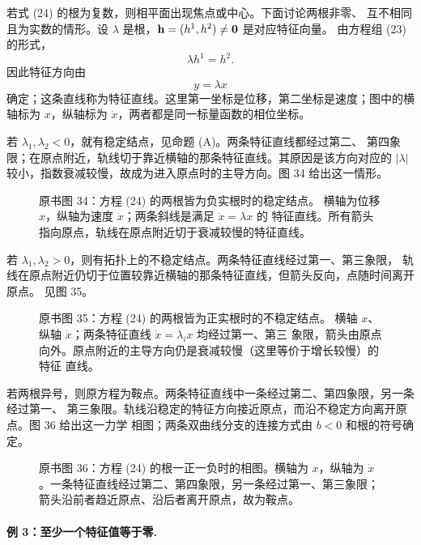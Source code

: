 若式 (24) 的根为复数，则相平面出现焦点或中心。下面讨论两根非零、
互不相同且为实数的情形。设 \(\lambda\) 是根，\(\vect{h}=(h^1,h^2)\neq\vect{0}\) 是对应特征向量。
由方程组 (23) 的形式，
\[
 \lambda h^1=h^2.
\]
因此特征方向由
\begin{equation}
 y=\lambda x
 \tag{25}
\end{equation}
确定；这条直线称为特征直线。这里第一坐标是位移，第二坐标是速度；图中的横轴标为
\(x\)，纵轴标为 \(\dot x\)，两者都是同一标量函数的相位坐标。

若 \(\lambda_1,\lambda_2<0\)，就有稳定结点，见命题 (A)。两条特征直线都经过第二、
第四象限；在原点附近，轨线切于靠近横轴的那条特征直线。其原因是该方向对应的
\(|\lambda|\) 较小，指数衰减较慢，故成为进入原点时的主导方向。图 34 给出这一情形。

\begin{figure}[H]
 \centering
 
 \caption{原书图 34：方程 (24) 的两根皆为负实根时的稳定结点。
 横轴为位移 \(x\)，纵轴为速度 \(\dot x\)；两条斜线是满足 \(\dot x=\lambda x\) 的
 特征直线。所有箭头指向原点，轨线在原点附近切于衰减较慢的特征直线。}
 \label{fig:ch2-p2-34}
\end{figure}

若 \(\lambda_1,\lambda_2>0\)，则有拓扑上的不稳定结点。两条特征直线经过第一、第三象限，
轨线在原点附近仍切于位置较靠近横轴的那条特征直线，但箭头反向，点随时间离开原点。
见图 35。

\begin{figure}[H]
 \centering
 
 \caption{原书图 35：方程 (24) 的两根皆为正实根时的不稳定结点。
 横轴 \(x\)、纵轴 \(\dot x\)；两条特征直线 \(\dot x=\lambda_i x\) 均经过第一、第三
 象限，箭头由原点向外。原点附近的主导方向仍是衰减较慢（这里等价于增长较慢）的特征
 直线。}
 \label{fig:ch2-p2-35}
\end{figure}

若两根异号，则原方程为鞍点。两条特征直线中一条经过第二、第四象限，另一条经过第一、
第三象限。轨线沿稳定的特征方向接近原点，而沿不稳定方向离开原点。图 36 给出这一力学
相图；两条双曲线分支的连接方式由 \(b<0\) 和根的符号确定。

\begin{figure}[H]
 \centering
 
 \caption{原书图 36：方程 (24) 的根一正一负时的相图。横轴为
 \(x\)，纵轴为 \(\dot x\)。一条特征直线经过第二、第四象限，另一条经过第一、第三象限；
 箭头沿前者趋近原点、沿后者离开原点，故为鞍点。}
 \label{fig:ch2-p2-36}
\end{figure}

\paragraph{例 3：至少一个特征值等于零.}

